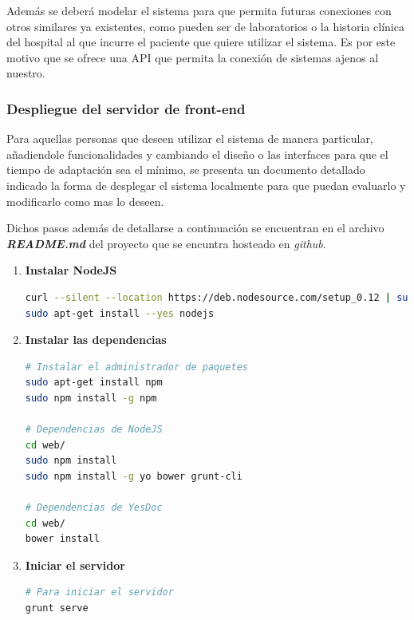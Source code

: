 \documentclass[a4paper,12pt]{article}
\begin{document}
Además se deberá modelar el sistema para que permita futuras conexiones con otros similares ya existentes, como pueden ser de laboratorios o la historia clínica del hospital al que incurre el paciente que quiere utilizar el sistema. Es por este motivo que se ofrece una API que permita la conexión de sistemas ajenos al nuestro.


\subsubsection{Despliegue del servidor de front-end}
Para aquellas personas que deseen utilizar el sistema de manera particular, añadiendole funcionalidades y cambiando el diseño o las interfaces para que el tiempo de adaptación sea el mínimo, se presenta un documento detallado indicado la forma de desplegar el sistema localmente para que puedan evaluarlo y modificarlo como mas lo deseen.

Dichos pasos además de detallarse a continuación se encuentran en el archivo \textit{\textbf{README.md}} del proyecto que se encuntra hosteado en \textit{github}.
\begin{enumerate}
\item \textbf{ Instalar NodeJS}

\begin{lstlisting}[language=bash]
curl --silent --location https://deb.nodesource.com/setup_0.12 | sudo bash -
sudo apt-get install --yes nodejs

\end{lstlisting}
\item \textbf{Instalar las dependencias}
\begin{lstlisting}[language=bash]
# Instalar el administrador de paquetes
sudo apt-get install npm
sudo npm install -g npm

# Dependencias de NodeJS
cd web/
sudo npm install
sudo npm install -g yo bower grunt-cli

# Dependencias de YesDoc
cd web/
bower install
\end{lstlisting}
\item \textbf{Iniciar el servidor}
\begin{lstlisting}[language=bash]
# Para iniciar el servidor
grunt serve
\end{lstlisting}


\end{enumerate}
\end{document}
